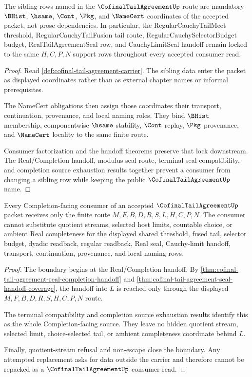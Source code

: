 \begin{theorem}
\label{thm:cofinal-tail-agreement-dependency-lock}
The sibling rows named in the $\CofinalTailAgreementUp$ route are mandatory $\BHist$, $\hsame$, $\Cont$, $\Pkg$, and $\NameCert$ coordinates of the accepted packet, not prose dependencies. In particular, the RegularCauchyTailMeet threshold, RegularCauchyTailFusion tail route, RegularCauchySelectorBudget budget, RealTailAgreementSeal row, and CauchyLimitSeal handoff remain locked to the same $H,C,P,N$ support rows throughout every accepted consumer read.
\end{theorem}
\begin{proof}
Read \autoref{def:cofinal-tail-agreement-carrier}. The sibling data enter the packet as displayed coordinates rather than as external chapter names or informal prerequisites.

The NameCert obligations then assign those coordinates their transport, continuation, provenance, and local naming roles. They bind $\BHist$ membership, componentwise $\hsame$ stability, $\Cont$ replay, $\Pkg$ provenance, and $\NameCert$ locality to the same finite route.

Consumer factorization and the handoff theorems preserve that lock downstream. The Real/Completion handoff, modulus-seal route, terminal seal compatibility, and completion source exhaustion results together prevent a consumer from changing a sibling row while keeping the public $\CofinalTailAgreementUp$ name.
\end{proof}

\begin{theorem}
\label{thm:cofinal-tail-agreement-completion-boundary}
Every Completion-facing consumer of an accepted $\CofinalTailAgreementUp$ packet receives only the finite route $M,F,B,D,R,S,L,H,C,P,N$. The consumer cannot substitute quotient streams, selected host limits, countable choice, or ambient Real completeness for the displayed shared threshold, fused tail, selector budget, dyadic readback, regular readback, Real seal, Cauchy-limit handoff, transport, continuation, provenance, and local naming rows.
\end{theorem}
\begin{proof}
The boundary begins at the Real/Completion handoff. By \autoref{thm:cofinal-tail-agreement-real-completion-handoff} and \autoref{thm:cofinal-tail-agreement-seal-handoff-coverage}, the handoff into $L$ is reached only through the displayed $M,F,B,D,R,S,H,C,P,N$ route.

The terminal compatibility and completion source exhaustion results identify this as the whole Completion-facing source. They leave no hidden quotient stream, selected limit, choice-selected tail, or ambient completeness coordinate behind $L$.

Finally, quotient-stream refusal and non-escape close the boundary. Any attempted replacement asks for data outside the carrier and therefore cannot be repacked as a $\CofinalTailAgreementUp$ consumer read.
\end{proof}

